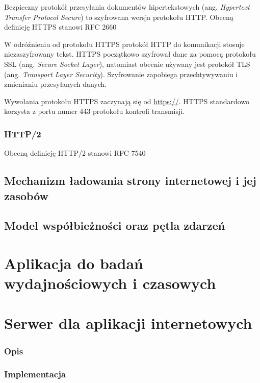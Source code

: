 \documentclass[polish, twoside, 12pt]{mwart}
\let\stdsection\section
\renewcommand*{\section}{\clearpage\stdsection}
\begin{document}
Bezpieczny protokół przesyłania dokumentów hipertekstowych (ang. \emph{Hypertext Transfer Protocol Secure}) to szyfrowana wersja protokołu HTTP. Obecną definicję HTTPS stanowi RFC 2660 \cite{rfc2660}

W odróżnieniu od protokołu HTTPS protokół HTTP do komunikacji stosuje niezaszyfrowany tekst. HTTPS początkowo szyfrował dane za pomocą protokołu SSL (ang. \emph{Secure Socket Layer}), natomiast obecnie używany jest protokół TLS (ang. \emph{Transport Layer Security}). Szyfrowanie zapobiega przechtywywaniu i zmienianiu przesyłanych danych. 

Wywołania protokołu HTTPS zaczynają się od \url{https://}. HTTPS standardowo korzysta z portu numer 443 protokołu kontroli transmisji. 

\subsubsection{HTTP/2}

Obecną definicję HTTP/2 stanowi RFC 7540 \cite{rfc7540}

\subsection{Mechanizm ładowania strony internetowej i jej zasobów}

\subsection{Model współbieżności oraz pętla zdarzeń}

\section{Aplikacja do badań wydajnościowych i czasowych}

\section{Serwer dla aplikacji internetowych} \label{server}

\subsubsection{Opis}

\subsubsection{Implementacja}
\end{document}
